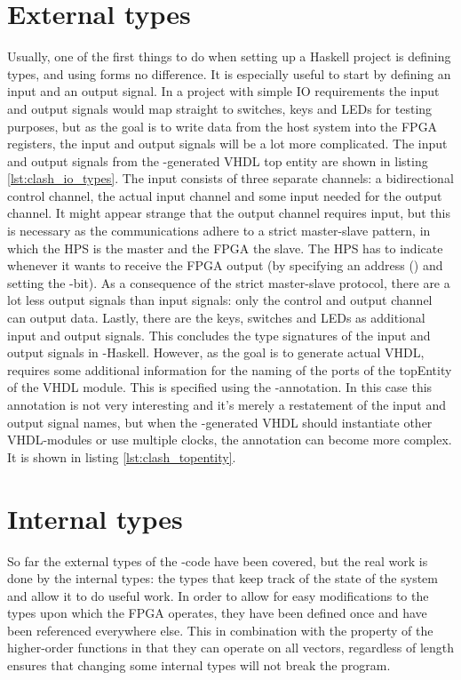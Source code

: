 \section{External types}
Usually, one of the first things to do when setting up a Haskell project is defining types, and using \clash{} forms no difference. It is especially useful to start by defining an input and an output signal. In a project with simple IO requirements the input and output signals would map straight to switches, keys and LEDs for testing purposes, but as the goal is to write data from the host system into the FPGA registers, the input and output signals will be a lot more complicated. The input and output signals from the \clash{}-generated VHDL top entity are shown in listing \ref{lst:clash_io_types}. The input consists of three separate channels: a bidirectional control channel, the actual input channel and some input needed for the output channel. It might appear strange that the output channel requires input, but this is necessary as the communications adhere to a strict master-slave pattern, in which the HPS is the master and the FPGA the slave. The HPS has to indicate whenever it wants to receive the FPGA output (by specifying an address () and setting the -bit). As a consequence of the strict master-slave protocol, there are a lot less output signals than input signals: only the control and output channel can output data. Lastly, there are the keys, switches and LEDs as additional input and output signals. This concludes the type signatures of the input and output signals in \clash{}-Haskell. However, as the goal is to generate actual VHDL, \clash{} requires some additional information for the naming of the ports of the topEntity of the VHDL module. This is specified using the -annotation. In this case this annotation is not very interesting and it's merely a restatement of the input and output signal names, but when the \clash{}-generated VHDL should instantiate other VHDL-modules or use multiple clocks, the annotation can become more complex. It is shown in listing \ref{lst:clash_topentity}. 




\section{Internal types}
So far the external types of the \clash{}-code have been covered, but the real work is done by the internal types: the types that keep track of the state of the system and allow it to do useful work. In order to allow for easy modifications to the types upon which the FPGA operates, they have been defined once and have been referenced everywhere else. This in combination with the property of the higher-order functions in \clash{} that they can operate on all vectors, regardless of length ensures that changing some internal types will not break the program.


